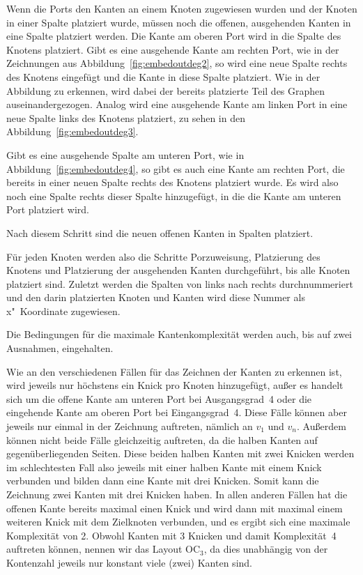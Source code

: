 \documentclass[a4paper]{scrreprt}
\theoremstyle{definition}
\begin{document}
Wenn die Ports den Kanten an einem Knoten zugewiesen wurden und der Knoten in einer Spalte platziert wurde, müssen noch die offenen, ausgehenden Kanten in eine Spalte platziert werden. Die Kante am oberen Port wird in die Spalte des Knotens platziert. Gibt es eine ausgehende Kante am rechten Port, wie in der Zeichnungen aus Abbildung~\ref{fig:embedoutdeg2}, so wird eine neue Spalte rechts des Knotens eingefügt und die Kante in diese Spalte platziert. Wie in der Abbildung zu erkennen, wird dabei der bereits platzierte Teil des Graphen auseinandergezogen. Analog wird eine ausgehende Kante am linken Port in eine neue Spalte links des Knotens platziert, zu sehen in den Abbildung~\ref{fig:embedoutdeg3}. 

Gibt es eine ausgehende Spalte am unteren Port, wie in Abbildung~\ref{fig:embedoutdeg4}, so gibt es auch eine Kante am rechten Port, die bereits in einer neuen Spalte rechts des Knotens platziert wurde. Es wird also noch eine Spalte rechts dieser Spalte hinzugefügt, in die die Kante am unteren Port platziert wird.

Nach diesem Schritt sind die neuen offenen Kanten in Spalten platziert.

Für jeden Knoten werden also die Schritte Porzuweisung, Platzierung des Knotens und Platzierung der ausgehenden Kanten durchgeführt, bis alle Knoten platziert sind. Zuletzt werden die Spalten von links nach rechts durchnummeriert und den darin platzierten Knoten und Kanten wird diese Nummer als x"~Koordinate zugewiesen.

Die Bedingungen für die maximale Kantenkomplexität werden auch, bis auf zwei Ausnahmen, eingehalten.

Wie an den verschiedenen Fällen für das Zeichnen der Kanten zu erkennen ist, wird jeweils nur höchstens ein Knick pro Knoten hinzugefügt, außer es handelt sich um die offene Kante am unteren Port bei Ausgangsgrad~4 oder die eingehende Kante am oberen Port bei Eingangsgrad~4. Diese Fälle können aber jeweils nur einmal in der Zeichnung auftreten, nämlich an $v_1$ und $v_n$. Außerdem können nicht beide Fälle gleichzeitig auftreten, da die halben Kanten auf gegenüberliegenden Seiten. Diese beiden halben Kanten mit zwei Knicken werden im schlechtesten Fall also jeweils mit einer halben Kante mit einem Knick verbunden und bilden dann eine Kante mit drei Knicken. Somit kann die Zeichnung zwei Kanten mit drei Knicken haben. In allen anderen Fällen hat die offenen Kante bereits maximal einen Knick und wird dann mit maximal einem weiteren Knick mit dem Zielknoten verbunden, und es ergibt sich eine maximale Komplexität von 2. Obwohl Kanten mit 3 Knicken und damit Komplexität~4 auftreten können, nennen wir das Layout OC$_3$, da dies unabhängig von der Kontenzahl jeweils nur konstant viele (zwei) Kanten sind.
\end{document}
